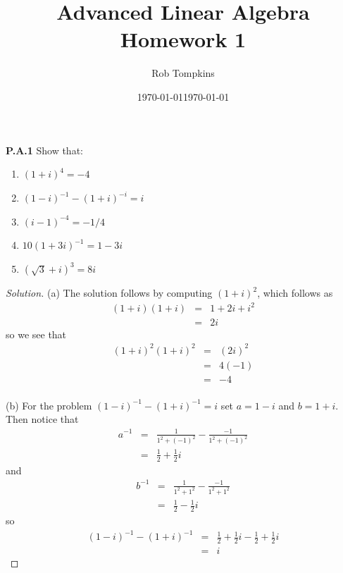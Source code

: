 \documentclass[12pt]{amsart}
\title{Advanced Linear Algebra\\Homework 1}
\author{Rob Tompkins}
\date{\today}
\newenvironment{solution}
{\begin{proof}[Solution]}
{\end{proof}}
\begin{document}
    \maketitle
    \date{\today}
    \begin{onehalfspace}

        \noindent\textbf{P.A.1} Show that:
        \begin{enumerate}[label=(\alph*)]
            \item $(1 + i)^4 = -4$
            \item $(1 - i)^{-1} - (1 + i)^{-i} = i$
            \item $(i - 1)^{-4} = -1/4$
            \item $10(1 + 3i)^{-1} = 1-3i$
            \item $(\sqrt{3} + i)^3 = 8i$
        \end{enumerate}
        \begin{solution}
            (a) The solution follows by computing $(1 + i)^2$, which follows as
            \begin{eqnarray*}
                (1 + i)(1 + i) & = & 1 + 2i + i^2 \\
                               & = & 2i
            \end{eqnarray*}
            so we see that
            \begin{eqnarray*}
                (1 + i)^2(1 + i)^2 & = & (2i)^2 \\
                                   & = & 4(-1) \\
                                   & = & -4 \\
            \end{eqnarray*}

            (b) For the problem $(1-i)^{-1} - (1+i)^{-1} = i$ set $a = 1 - i$ and $b = 1 + i$. Then notice that
            \begin{eqnarray*}
                a^{-1} & = & \frac{1}{1^2 + (-1)^2} - \frac{-1}{1^2+(-1)^2} \\
                       & = & \frac{1}{2} + \frac{1}{2}i
            \end{eqnarray*}
            and
            \begin{eqnarray*}
                b^{-1} & = & \frac{1}{1^2 + 1^2} - \frac{-1}{1^2+1^2} \\
                       & = & \frac{1}{2} - \frac{1}{2}i
            \end{eqnarray*}
            so
            \begin{eqnarray*}
                (1 - i)^{-1} - (1 + i)^{-1} & = & \frac{1}{2} + \frac{1}{2}i - \frac{1}{2} + \frac{1}{2}i \\
                                            & = & i
            \end{eqnarray*}


\end{solution}
\end{onehalfspace}
\end{document}

